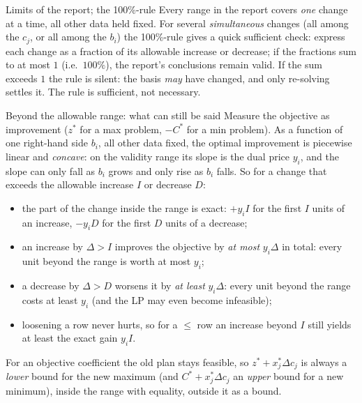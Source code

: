 \begin{rulebox}{Limits of the report; the 100\%-rule}
Every range in the report covers \emph{one} change at a time, all other
data held fixed. For several \emph{simultaneous} changes (all among the
$c_{j}$, or all among the $b_{i}$) the 100\%-rule gives a quick sufficient check: express each
change as a fraction of its allowable increase or decrease; if the
fractions sum to at most $1$ (i.e.\ $100\%$), the report's conclusions
remain valid. If the sum exceeds $1$ the rule is silent: the basis
\emph{may} have changed, and only re-solving settles it. The rule is
sufficient, not necessary.
\end{rulebox}

\begin{rulebox}{Beyond the allowable range: what can still be said}
Measure the objective as improvement ($z^{*}$ for a max problem, $-C^{*}$
for a min problem). As a function of one right-hand side $b_{i}$, all
other data fixed, the optimal improvement is piecewise linear and
\emph{concave}: on the validity range its slope is the dual price $y_{i}$,
and the slope can only fall as $b_{i}$ grows and only rise as $b_{i}$
falls. So for a change that exceeds the allowable increase $I$ or decrease
$D$:
\begin{itemize}[leftmargin=1.6em,itemsep=0.3ex]
  \item the part of the change inside the range is exact: $+y_{i}I$ for
        the first $I$ units of an increase, $-y_{i}D$ for the first $D$
        units of a decrease;
  \item an increase by $\Delta>I$ improves the objective by \emph{at most}
        $y_{i}\Delta$ in total: every unit beyond the range is worth at
        most $y_{i}$;
  \item a decrease by $\Delta>D$ worsens it by \emph{at least}
        $y_{i}\Delta$: every unit beyond the range costs at least $y_{i}$
        (and the LP may even become infeasible);
  \item loosening a row never hurts, so for a $\le$ row an increase
        beyond $I$ still yields at least the exact gain $y_{i}I$.
\end{itemize}
For an objective coefficient the old plan stays feasible, so
$z^{*}+x_{j}^{*}\Delta c_{j}$ is always a \emph{lower} bound for the new
maximum (and $C^{*}+x_{j}^{*}\Delta c_{j}$ an \emph{upper} bound for a new
minimum), inside the range with equality, outside it as a bound.
\end{rulebox}

